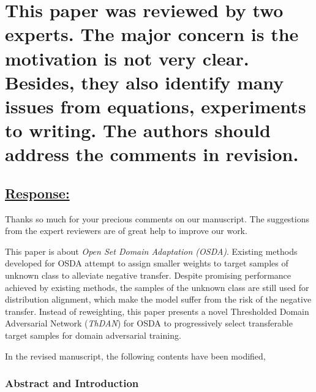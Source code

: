 \section*{This paper was reviewed by two experts.
    The major concern is the motivation is not very clear.
    Besides, they also identify many issues from equations, experiments to writing.
    The authors should address the comments in revision.
}
\subsection*{\underline{\textbf{Response:}}}

Thanks so much for your precious comments on our manuscript.
The suggestions from the expert reviewers are of great help to improve our work.

This paper is about \textit{Open Set Domain Adaptation (OSDA)}. Existing methods developed for OSDA attempt to assign smaller weights to target samples of unknown class to alleviate negative transfer.
Despite promising performance achieved by existing methods, the samples of the unknown class are still used for distribution alignment, which make the model suffer from the risk of the negative transfer. 
Instead of reweighting, this paper presents a novel Thresholded Domain Adversarial Network (\textit{ThDAN}) for OSDA to progressively select transferable target samples for domain adversarial training.

In the revised manuscript, the following contents have been modified,

\subsubsection*{{\textbf{Abstract and Introduction}}}

